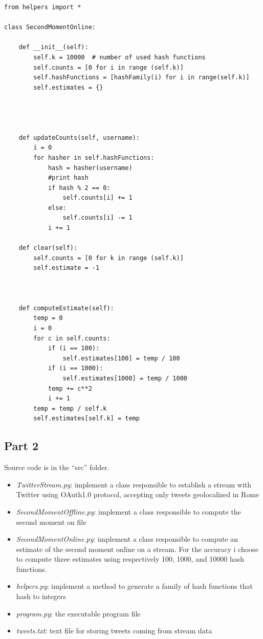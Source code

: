 \documentclass{article}
\begin{document}
\begin{lstlisting}
from helpers import *

class SecondMomentOnline:

    def __init__(self):
        self.k = 10000  # number of used hash functions
        self.counts = [0 for i in range (self.k)]
        self.hashFunctions = [hashFamily(i) for i in range(self.k)]
        self.estimates = {}




    def updateCounts(self, username):
        i = 0
        for hasher in self.hashFunctions:
            hash = hasher(username)
            #print hash
            if hash % 2 == 0:
                self.counts[i] += 1
            else:
                self.counts[i] -= 1
            i += 1

    def clear(self):
        self.counts = [0 for k in range (self.k)]
        self.estimate = -1



    def computeEstimate(self):
        temp = 0
        i = 0
        for c in self.counts:
            if (i == 100):
                self.estimates[100] = temp / 100
            if (i == 1000):
                self.estimates[1000] = temp / 1000
            temp += c**2
            i += 1
        temp = temp / self.k
        self.estimates[self.k] = temp

\end{lstlisting}









\subsection{Part 2}
Source code is in the ``src'' folder. 

\begin{itemize}
    \item \textit{TwitterStream.py}: implement a class responsible to establish a stream with Twitter using OAuth1.0 protocol, accepting only tweets geolocalized in Rome
    \item \textit{SecondMomentOffline.py}: implement a class responsible to compute the second moment on file
    \item \textit{SecondMomentOnline.py}: implement a class responsible to compute an estimate of the second moment online on a stream. For the accuracy i choose to compute three estimates using respectively 100, 1000, and 10000 hash functions. 
    \item \textit{helpers.py}: implement a method to generate a family of hash functions that hash to integers
    \item \textit{program.py}: the executable program file
    \item \textit{tweets.txt}: text file for storing tweets coming from stream data
\end{itemize}
\end{document}
